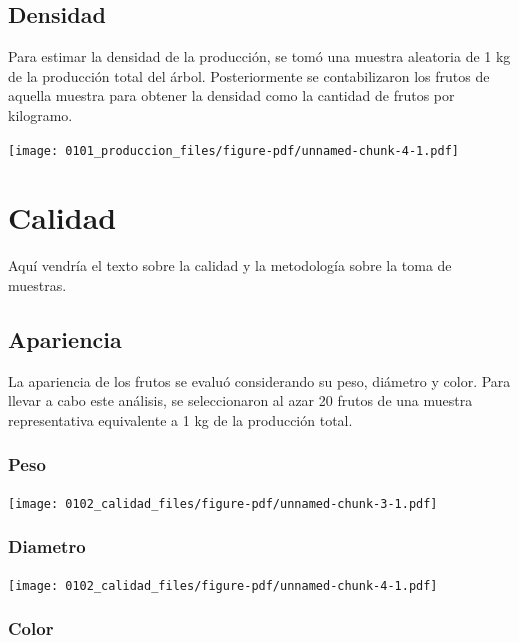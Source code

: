 \documentclass[
  letterpaper,
  DIV=11,
  numbers=noendperiod]{scrreprt}
\begin{document}
\section{Densidad}\label{densidad}

Para estimar la densidad de la producción, se tomó una muestra aleatoria
de 1 kg de la producción total del árbol. Posteriormente se
contabilizaron los frutos de aquella muestra para obtener la densidad
como la cantidad de frutos por kilogramo.

\begin{center}
\texttt{[image: 0101\_produccion\_files/figure-pdf/unnamed-chunk-4-1.pdf]}
\end{center}

\chapter{Calidad}\label{calidad}

Aquí vendría el texto sobre la calidad y la metodología sobre la toma de
muestras.

\section{Apariencia}\label{apariencia}

La apariencia de los frutos se evaluó considerando su peso, diámetro y
color. Para llevar a cabo este análisis, se seleccionaron al azar 20
frutos de una muestra representativa equivalente a 1 kg de la producción
total.

\subsection{Peso}\label{peso}

\begin{center}
\texttt{[image: 0102\_calidad\_files/figure-pdf/unnamed-chunk-3-1.pdf]}
\end{center}

\subsection{Diametro}\label{diametro}

\begin{center}
\texttt{[image: 0102\_calidad\_files/figure-pdf/unnamed-chunk-4-1.pdf]}
\end{center}

\subsection{Color}\label{color}
\end{document}
